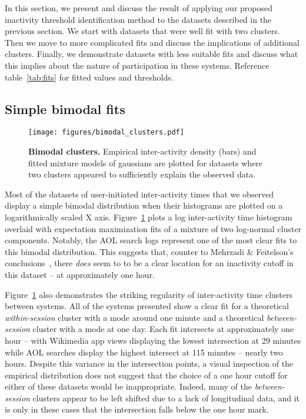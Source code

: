 In this section, we present and discuss the result of applying our proposed inactivity threshold identification method to the datasets described in the previous section.  We start with datasets that were well fit with two clusters.  Then we move to more complicated fits and discuss the implications of additional clusters.  Finally, we demonstrate datasets with less suitable fits and discuss what this implies about the nature of participation in these systems.  Reference table~\ref{tab:fits} for fitted values and thresholds.

\pagebreak
\subsection{Simple bimodal fits}
\begin{figure}
\centering
\texttt{[image: figures/bimodal\_clusters.pdf]}
\caption{
    \textbf{Bimodal clusters.} Empirical inter-activity density (bars) and fitted mixture models of gaussians are plotted for datasets where two clusters appeared to sufficiently explain the observed data.
}
\label{fig:bimodal_clusters}
\end{figure}
Most of the datasets of user-initiated inter-activity times that we observed display a simple bimodal distribution when their histograms are plotted on a logarithmically scaled X axis.  Figure~\ref{fig:bimodal_clusters} plots a log inter-activity time histogram overlaid with expectation maximization fits of a mixture of two log-normal cluster components.  Notably, the AOL search logs represent one of the most clear fits to this bimodal distribution.  This suggests that, counter to Mehrzadi \& Feitelson's conclusions~\cite{mehrzadi2012onextracting}, there \emph{does} seem to to be a clear location for an inactivity cutoff in this dataset -- at approximately one hour.

Figure~\ref{fig:bimodal_clusters} also demonstrates the striking regularity of inter-activity time clusters between systems.  All of the systems presented show a clear fit for a theoretical \emph{within-session} cluster with a mode around one minute and a theoretical \emph{between-session} cluster with a mode at one day.  Each fit intersects at approximately one hour -- with Wikimedia app views displaying the lowest intersection at 29 minutes while AOL searches display the highest intersect at 115 minutes -- nearly two hours.   Despite this variance in the intersection points, a visual inspection of the empirical distribution does not suggest that the choice of a one hour cutoff for either of these datasets would be inappropriate.  Indeed, many of the \emph{between-session} clusters appear to be left shifted due to a lack of longitudinal data, and it is only in these cases that the intersection falls below the one hour mark.

